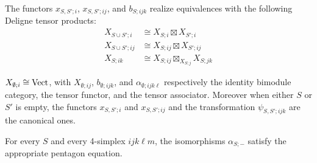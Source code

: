 \documentclass[a4paper]{amsart}
\begin{document}
\begin{list}{(TCO)}{}
	\item  The functors $x_{S,S';i}$, $x_{S,S'; ij}$, and $b_{S;ijk}$ realize equivalences with the following Deligne tensor products:
	\begin{align*}
		X_{S \cup S'; i} &\cong X_{S; i} \boxtimes X_{S';i} \\ 
		X_{S \cup S'; ij} &\cong X_{S; ij} \boxtimes X_{S';ij} \\ 
		X_{S; ik} & \cong X_{S;ij} \boxtimes_{X_{S;j}} X_{S;jk}
	\end{align*}
	\item  $X_{\emptyset; i} \cong \mathrm{Vect}$, with $X_{\emptyset; ij}$, $b_{\emptyset; ijk}$, and $\alpha_{\emptyset; ijk\ell}$ respectively the identity bimodule category, the tensor functor, and the tensor associator.  Moreover when either $S$ or $S'$ is empty, the functors $x_{S,S'; i}$ and $x_{S, S'; ij}$ and the transformation $\psi_{S,S'; ijk}$ are the canonical ones.  
	\item  For every $S$ and every 4-simplex $ijk\ell m$, the isomorphisms $\alpha_{S; -}$ satisfy the appropriate pentagon equation.


\end{list}
\end{document}
